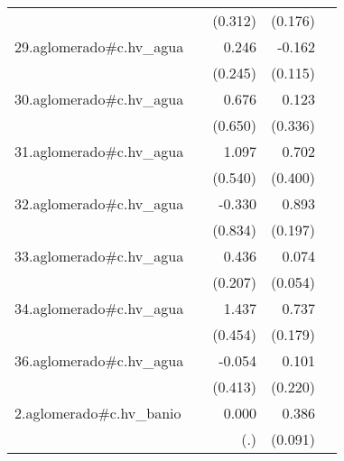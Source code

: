 {\begin{longtable}{l*{4}{D{.}{.}{-1}}}
            &                     &     (0.312)         &     (0.176)         &                     \\
\addlinespace
29.aglomerado#c.hv\_agua&                     &       0.246         &      -0.162         &                     \\
            &                     &     (0.245)         &     (0.115)         &                     \\
\addlinespace
30.aglomerado#c.hv\_agua&                     &       0.676         &       0.123         &                     \\
            &                     &     (0.650)         &     (0.336)         &                     \\
\addlinespace
31.aglomerado#c.hv\_agua&                     &       1.097\sym{*}  &       0.702         &                     \\
            &                     &     (0.540)         &     (0.400)         &                     \\
\addlinespace
32.aglomerado#c.hv\_agua&                     &      -0.330         &       0.893\sym{***}&                     \\
            &                     &     (0.834)         &     (0.197)         &                     \\
\addlinespace
33.aglomerado#c.hv\_agua&                     &       0.436\sym{*}  &       0.074         &                     \\
            &                     &     (0.207)         &     (0.054)         &                     \\
\addlinespace
34.aglomerado#c.hv\_agua&                     &       1.437\sym{**} &       0.737\sym{***}&                     \\
            &                     &     (0.454)         &     (0.179)         &                     \\
\addlinespace
36.aglomerado#c.hv\_agua&                     &      -0.054         &       0.101         &                     \\
            &                     &     (0.413)         &     (0.220)         &                     \\
\addlinespace
2.aglomerado#c.hv\_banio&                     &       0.000         &       0.386\sym{***}&                     \\
            &                     &         (.)         &     (0.091)         &                     \\

\end{longtable}}
